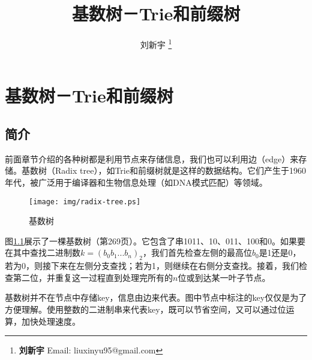 \documentclass[UTF8]{article}
\begin{document}


\title{基数树－Trie和前缀树}

\author{刘新宇
\thanks{{\bfseries 刘新宇 } \newline
  Email: liuxinyu95@gmail.com \newline}
  }

\maketitle
\fi


\ifx\wholebook\relax
\chapter{基数树－Trie和前缀树}
\fi



\section{简介}
\label{introduction}

前面章节介绍的各种树都是利用节点来存储信息，我们也可以利用边（edge）来存储。基数树（Radix tree），如Trie和前缀树就是这样的数据结构。它们产生于1960年代，被广泛用于编译器\cite{okasaki-int-map}和生物信息处理（如DNA模式匹配）\cite{wiki-suffix-tree}等领域。

\begin{figure}[htbp]
  \centering
  \texttt{[image: img/radix-tree.ps]}
  \caption{基数树} \label{fig:radix-tree}
\end{figure}

图\ref{fig:radix-tree}展示了一棵基数树（\cite{CLRS}第269页）。它包含了串1011、10、011、100和0。如果要在其中查找二进制数$k=(b_0b_1...b_n)_2$，我们首先检查左侧的最高位$b_0$是1还是0，若为0，则接下来在左侧分支查找；若为1，则继续在右侧分支查找。接着，我们检查第二位，并重复这一过程直到处理完所有的$n$位或到达某一叶子节点。

基数树并不在节点中存储key，信息由边来代表。图中节点中标注的key仅仅是为了方便理解。使用整数的二进制串来代表key，既可以节省空间，又可以通过位运算，加快处理速度。
\end{document}
